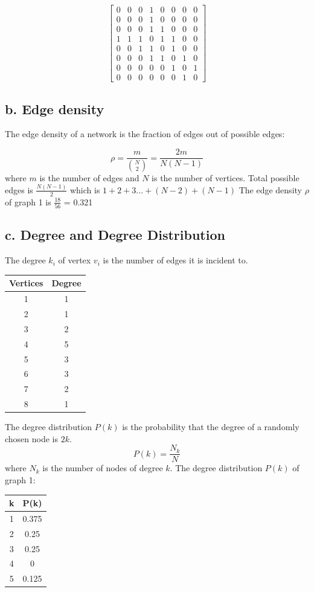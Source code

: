 \documentclass[a4paper,12pt]{article}
\begin{document}
	$$
	\begin{bmatrix} 
		0&0&0&1&0&0&0&0\\
		0&0&0&1&0&0&0&0\\
		0&0&0&1&1&0&0&0\\
		1&1&1&0&1&1&0&0\\
		0&0&1&1&0&1&0&0\\
		0&0&0&1&1&0&1&0\\
		0&0&0&0&0&1&0&1\\
		0&0&0&0&0&0&1&0
	\end{bmatrix}$$

\subsection*{b. Edge density}
The edge density of a network is the fraction of edges out of possible edges:

$$\rho = \frac{m}{{N\choose 2}} = \frac{2m}{N(N-1)}$$
where $m$ is the number of edges and $N$ is the number of vertices.
\newline Total possible edges is
$\frac{N(N-1)}{2}$ which is $1 + 2 + 3 ... + (N-2) + (N-1)$
\newline \newline
The edge density $\rho$ of graph 1 is $\frac{18}{56}$ = 0.321

\subsection*{c. Degree and Degree Distribution}
The degree $k_i$ of vertex $v_i$ is the number of edges it is incident to.\newline
\begin{table}[h]
\centering
\begin{tabular}{c|c}
Vertices & Degree\\
\hline
1 & 1\\
2 & 1\\
3 & 2\\
4 & 5\\
5 & 3\\
6 & 3\\
7 & 2\\
8 & 1
\end{tabular}
\end{table}
\break
The degree distribution $P(k)$ is the probability that the degree of a randomly chosen node is $2k$.
$$P(k) = \frac{N_k}{N}$$
where $N_k$ is the number of nodes of degree $k$.\newline\newline
The degree distribution $P(k)$ of graph 1: 
\begin{table}[h]
\centering
\begin{tabular}{c|c}
k & P(k)\\
\hline
1 & 0.375\\
2 & 0.25\\
3 & 0.25\\
4 & 0\\
5 & 0.125
\end{tabular}
\end{table}
\end{document}

